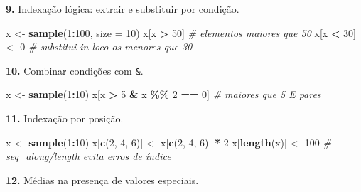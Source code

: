 \documentclass[
  portuguese,
  11pt,
  openany]{book}
\newenvironment{Shaded}{\begin{snugshade}}{\end{snugshade}}
\newcommand{\AttributeTok}[1]{\textcolor[rgb]{0.13,0.29,0.53}{#1}}
\newcommand{\CommentTok}[1]{\textcolor[rgb]{0.56,0.35,0.01}{\textit{#1}}}
\newcommand{\DecValTok}[1]{\textcolor[rgb]{0.00,0.00,0.81}{#1}}
\newcommand{\FunctionTok}[1]{\textcolor[rgb]{0.13,0.29,0.53}{\textbf{#1}}}
\newcommand{\NormalTok}[1]{#1}
\newcommand{\OtherTok}[1]{\textcolor[rgb]{0.56,0.35,0.01}{#1}}
\newcommand{\SpecialCharTok}[1]{\textcolor[rgb]{0.81,0.36,0.00}{\textbf{#1}}}
\begin{document}
\textbf{9.} Indexação lógica: extrair e substituir por condição.

\begin{Shaded}
\begin{Highlighting}[]
\NormalTok{x }\OtherTok{\textless{}{-}} \FunctionTok{sample}\NormalTok{(}\DecValTok{1}\SpecialCharTok{:}\DecValTok{100}\NormalTok{, }\AttributeTok{size =} \DecValTok{10}\NormalTok{)}
\NormalTok{x[x }\SpecialCharTok{\textgreater{}} \DecValTok{50}\NormalTok{]        }\CommentTok{\# elementos maiores que 50}
\NormalTok{x[x }\SpecialCharTok{\textless{}} \DecValTok{30}\NormalTok{] }\OtherTok{\textless{}{-}} \DecValTok{0}   \CommentTok{\# substitui in loco os menores que 30}
\end{Highlighting}
\end{Shaded}

\textbf{10.} Combinar condições com \texttt{\&}.

\begin{Shaded}
\begin{Highlighting}[]
\NormalTok{x }\OtherTok{\textless{}{-}} \FunctionTok{sample}\NormalTok{(}\DecValTok{1}\SpecialCharTok{:}\DecValTok{10}\NormalTok{)}
\NormalTok{x[x }\SpecialCharTok{\textgreater{}} \DecValTok{5} \SpecialCharTok{\&}\NormalTok{ x }\SpecialCharTok{\%\%} \DecValTok{2} \SpecialCharTok{==} \DecValTok{0}\NormalTok{]   }\CommentTok{\# maiores que 5 E pares}
\end{Highlighting}
\end{Shaded}

\textbf{11.} Indexação por posição.

\begin{Shaded}
\begin{Highlighting}[]
\NormalTok{x }\OtherTok{\textless{}{-}} \FunctionTok{sample}\NormalTok{(}\DecValTok{1}\SpecialCharTok{:}\DecValTok{10}\NormalTok{)}
\NormalTok{x[}\FunctionTok{c}\NormalTok{(}\DecValTok{2}\NormalTok{, }\DecValTok{4}\NormalTok{, }\DecValTok{6}\NormalTok{)] }\OtherTok{\textless{}{-}}\NormalTok{ x[}\FunctionTok{c}\NormalTok{(}\DecValTok{2}\NormalTok{, }\DecValTok{4}\NormalTok{, }\DecValTok{6}\NormalTok{)] }\SpecialCharTok{*} \DecValTok{2}
\NormalTok{x[}\FunctionTok{length}\NormalTok{(x)] }\OtherTok{\textless{}{-}} \DecValTok{100}      \CommentTok{\# seq\_along/length evita erros de índice}
\end{Highlighting}
\end{Shaded}

\textbf{12.} Médias na presença de valores especiais.
\end{document}
